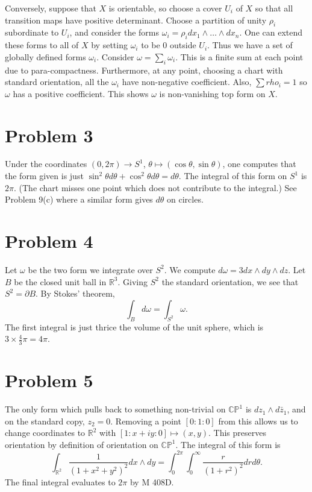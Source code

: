 \documentclass{amsart}
\numberwithin{equation}{section}
\theoremstyle{plain}
\theoremstyle{definition}
\theoremstyle{remark}
\renewcommand{\_}[2]{\underbrace{#1}_{#2}}
\renewcommand{\^}[2]{\overbrace{#1}_{#2}}
\newcommand{\R}{\mathbb{R}}
\renewcommand{\P}{\mathbb{P}}
\newcommand{\C}{\mathbb{C}}
\begin{document}
Conversely, suppose that $X$ is orientable, so choose a cover $U_i$ of $X$ so that all transition maps have positive determinant. Choose a partition of unity $\rho_i$ subordinate to $U_i$, and consider the forms $\omega_i = \rho_i dx_1 \wedge \dots \wedge dx_n$. One can extend these forms to all of $X$ by setting $\omega_i$ to be $0$ outside $U_i$. Thus we have a set of globally defined forms $\omega_i$. Consider $\omega = \sum_i \omega_i$. This is a finite sum at each point due to para-compactness. Furthermore, at any point, choosing a chart with standard orientation, all the $\omega_i$ have non-negative coefficient. Also, $\sum rho_i = 1$ so $\omega$ has a positive coefficient. This shows $\omega$ is non-vanishing top form on $X$.

\section*{Problem 3}
Under the coordinates $(0,2\pi) \to S^1$, $\theta \mapsto (\cos\theta, \sin \theta)$, one computes that the form given is just $\sin^2\theta d\theta + \cos^2 \theta d\theta = d\theta$. The integral of this form on $S^1$ is $2\pi$. (The chart misses one point which does not contribute to the integral.) See Problem 9(c) where a similar form gives $d\theta$ on circles.

\section*{Problem 4}

Let $\omega$ be the two form we integrate over $S^2$. We compute $d\omega = 3 dx\wedge dy \wedge dz$. Let $B$ be the closed unit ball in $\R^3$. Giving $S^2$ the standard orientation, we see that $S^2 = \partial B$. By Stokes' theorem, \[\int_B d\omega = \int_{S^2}\omega.\] The first integral is just thrice the volume of the unit sphere, which is $3\times \frac 43 \pi = 4\pi$.

\section*{Problem 5}
The only form which pulls back to something non-trivial on $\C\P^1$ is $dz_1 \wedge d\bar z_1$, and on the standard copy, $z_2= 0$. Removing a point $[0:1:0]$ from this allows us to change coordinates to $\R^2$ with $[1:x+iy:0] \mapsto (x,y)$. This preserves orientation by definition of orientation on $\C\P^1$. The integral of this form is \[\int_{\R^2} \frac{1}{(1+x^2+y^2)^2} dx\wedge dy = \int_0^{2\pi}\int_0^\infty \frac{r}{(1+r^2)^2} drd\theta.\] The final integral evaluates to $2\pi$ by M 408D.
\end{document}
